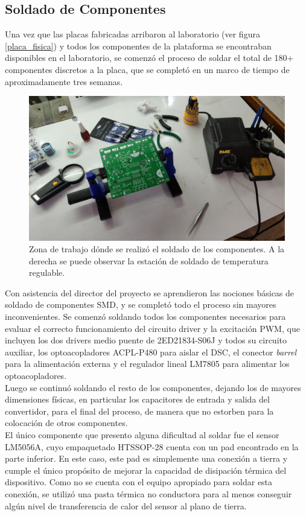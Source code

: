 \subsection{Soldado de Componentes}

Una vez que las placas fabricadas arribaron al laboratorio (ver figura \ref{placa_fisica}) y todos los componentes de la plataforma se encontraban disponibles en el laboratorio, se comenzó el proceso de soldar el total de 180+ componentes discretos a la placa, que se completó en un marco de tiempo de aproximadamente tres semanas.\\

\begin{figure}[h]
    \centering
    \includegraphics[scale=0.09]{Imagenes/Soldado.jpg}
    \caption{Zona de trabajo dónde se realizó el soldado de los componentes. A la derecha se puede observar la estación de soldado de temperatura regulable.}
    \label{soldado}
\end{figure}

Con asistencia del director del proyecto se aprendieron las nociones básicas de soldado de componentes SMD, y se completó todo el proceso sin mayores inconvenientes. Se comenzó soldando todos los componentes necesarios para evaluar el correcto funcionamiento del circuito driver y la excitación PWM, que incluyen los dos drivers medio puente de 2ED21834-S06J y todos su circuito auxiliar, los optoacopladores ACPL-P480 para aislar el DSC, el conector \textit{barrel} para la alimentación externa y el regulador lineal LM7805 para alimentar los optoacopladores.\\

Luego se continuó soldando el resto de los componentes, dejando los de mayores dimensiones físicas, en particular los capacitores de entrada y salida del convertidor, para el final del proceso, de manera que no estorben para la colocación de otros componentes.\\

El único componente que presento alguna dificultad al soldar fue el sensor LM5056A, cuyo empaquetado HTSSOP-28 cuenta con un pad encontrado en la parte inferior. En este caso, este pad es simplemente una conexión a tierra y cumple el único propósito de mejorar la capacidad de disipación térmica del dispositivo. Como no se cuenta con el equipo apropiado para soldar esta conexión, se utilizó una pasta térmica no conductora para al menos conseguir algún nivel de transferencia de calor del sensor al plano de tierra.\\